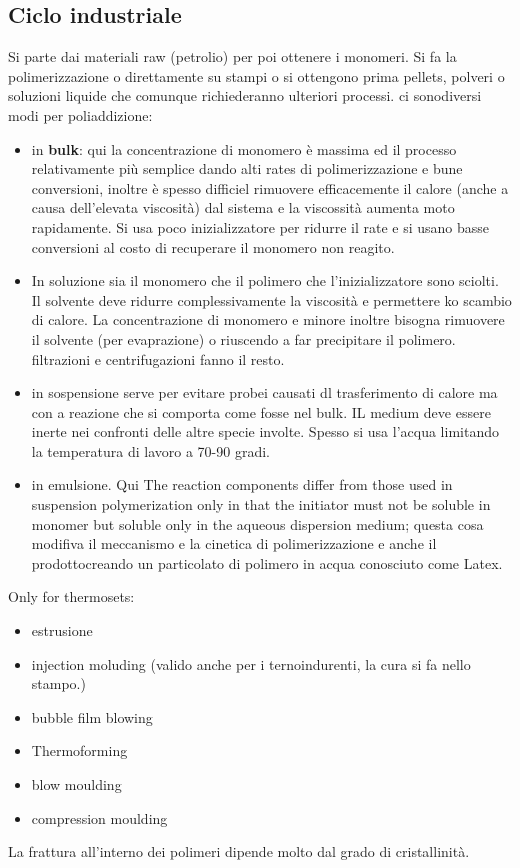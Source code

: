 \subsection{Ciclo industriale}
Si parte dai materiali raw (petrolio) per poi ottenere i monomeri. Si fa la polimerizzazione o direttamente su stampi o si ottengono prima pellets, polveri o soluzioni liquide che comunque richiederanno ulteriori processi. ci sonodiversi modi per poliaddizione:
\begin{itemize}
    \item in \textbf{bulk}: qui la concentrazione di monomero è massima ed il processo relativamente  più semplice dando alti rates di polimerizzazione e bune conversioni, inoltre è spesso difficiel rimuovere efficacemente il calore (anche a causa dell'elevata viscosità) dal sistema e la viscossità aumenta moto rapidamente. Si usa poco inizializzatore per ridurre il rate e si usano basse conversioni al costo di recuperare il monomero non reagito.
    \item In soluzione sia il monomero che il polimero che l'inizializzatore sono sciolti. Il solvente deve ridurre complessivamente la viscosità  e permettere ko scambio di calore. La concentrazione di monomero e minore inoltre bisogna rimuovere il solvente (per evaprazione) o riuscendo a far precipitare il polimero. filtrazioni e centrifugazioni fanno il resto.
    \item in sospensione serve per evitare probei causati dl trasferimento di calore ma con a reazione che si comporta come fosse nel bulk. IL medium deve essere inerte nei confronti delle altre specie involte. Spesso si usa l'acqua limitando la temperatura di lavoro a 70-90 gradi. 
    \item in emulsione. Qui The reaction components differ from those used in 
suspension polymerization only in that the initiator 
must not be soluble in monomer but soluble only in the aqueous dispersion medium; questa cosa modifiva il meccanismo e la cinetica di polimerizzazione e anche il prodottocreando un particolato di polimero in acqua conosciuto come Latex.
    \end{itemize}
    Only for thermosets:
    \begin{itemize}
        \item estrusione
        \item injection moluding (valido anche per i ternoindurenti, la cura si fa nello stampo.)
        \item bubble film blowing
        \item Thermoforming
        \item blow moulding
        \item compression moulding
    \end{itemize}
La frattura all'interno dei polimeri dipende molto dal grado di cristallinità. 
